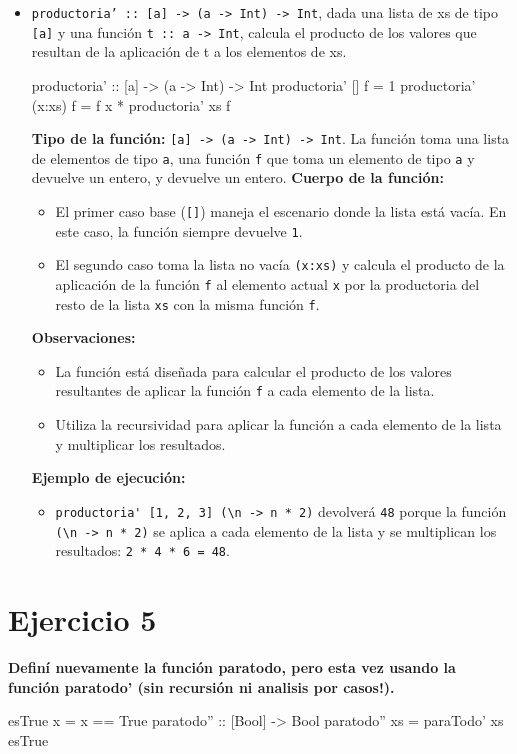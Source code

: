 \documentclass{article}
\begin{document}
\begin{itemize}
    \item 
\verb|productoria’ :: [a] -> (a -> Int) -> Int|, dada una lista de xs de tipo \verb|[a]| y una función \verb|t :: a -> Int|, calcula el producto de los valores que resultan de la aplicación de t a los elementos de xs.
\begin{haskell}
productoria' :: [a] -> (a -> Int) -> Int
productoria' [] f = 1
productoria' (x:xs) f = f x * productoria' xs f
\end{haskell}
\textbf{Tipo de la función:} \verb|[a] -> (a -> Int) -> Int|. La función toma una lista de elementos de tipo \verb|a|, una función \verb|f| que toma un elemento de tipo \verb|a| y devuelve un entero, y devuelve un entero.
\textbf{Cuerpo de la función:}
\begin{itemize}
\item El primer caso base (\verb|[]|) maneja el escenario donde la lista está vacía. En este caso, la función siempre devuelve \verb|1|.
\item El segundo caso toma la lista no vacía \verb|(x:xs)| y calcula el producto de la aplicación de la función \verb|f| al elemento actual \verb|x| por la productoria del resto de la lista \verb|xs| con la misma función \verb|f|.
\end{itemize}
\textbf{Observaciones:}
\begin{itemize}
\item La función está diseñada para calcular el producto de los valores resultantes de aplicar la función \verb|f| a cada elemento de la lista.
\item Utiliza la recursividad para aplicar la función a cada elemento de la lista y multiplicar los resultados.
\end{itemize}
\textbf{Ejemplo de ejecución:}
\begin{itemize}
\item \verb|productoria' [1, 2, 3] (\n -> n * 2)| devolverá \verb|48| porque la función \verb|(\n -> n * 2)| se aplica a cada elemento de la lista y se multiplican los resultados: \verb|2 * 4 * 6 = 48|.
\end{itemize}
\end{itemize}

\section*{Ejercicio 5}
\textbf{Definí nuevamente la función paratodo, pero esta vez usando la función paratodo’ (sin recursión ni analisis por casos!).}
\begin{haskell}
esTrue x = x == True
paratodo'' :: [Bool] -> Bool
paratodo'' xs = paraTodo' xs esTrue
\end{haskell}
\end{document}
